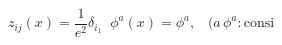 \documentclass[12pt]{article}
\begin{document}
\begin{displaymath}
z _ { i j } ( x ) = \frac { 1 } { e ^ { 2 } } \delta _ { i _ { 1 } } \; \; \phi ^ { a } ( x ) = \phi ^ { a } , \; \; \; ( a \, \phi ^ { a } : \mathrm { c o n s i }
\end{displaymath}
\end{document}
